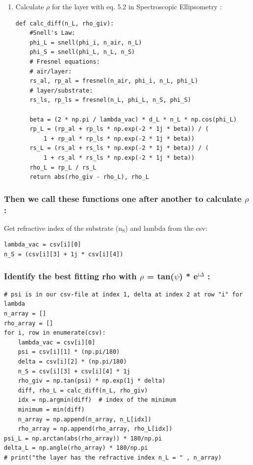 \documentclass[11pt]{article}
\begin{document}
\begin{enumerate}
\item Calculate \(\rho\) for the layer with eq. 5.2 in Spectroscopic Ellipsometry :
\label{sec:org50aedcb}
\begin{verbatim}
def calc_diff(n_L, rho_giv):
    #Snell's Law:
    phi_L = snell(phi_i, n_air, n_L)
    phi_S = snell(phi_L, n_L, n_S)
    # Fresnel equations:
    # air/layer:
    rs_al, rp_al = fresnel(n_air, phi_i, n_L, phi_L)
    # layer/substrate:
    rs_ls, rp_ls = fresnel(n_L, phi_L, n_S, phi_S)

    beta = (2 * np.pi / lambda_vac) * d_L * n_L * np.cos(phi_L)
    rp_L = (rp_al + rp_ls * np.exp(-2 * 1j * beta)) / (
        1 + rp_al * rp_ls * np.exp(-2 * 1j * beta))
    rs_L = (rs_al + rs_ls * np.exp(-2 * 1j * beta)) / (
        1 + rs_al * rs_ls * np.exp(-2 * 1j * beta))
    rho_L = rp_L / rs_L
    return abs(rho_giv - rho_L), rho_L
\end{verbatim}
\end{enumerate}


\subsubsection{Then we call these functions one after another to calculate \(\rho\):}
\label{sec:orgf340923}
Get refractive index of the substrate (n\(_{\text{S}}\)) and lambda from the csv:
\begin{verbatim}
lambda_vac = csv[i][0]
n_S = (csv[i][3] + 1j * csv[i][4])
\end{verbatim}


\subsubsection{Identify the best fitting rho with \(\rho\) = tan(\(\psi\)) * e\(^{\text{i}\Delta}\) :}
\label{sec:orgc6ab954}

\begin{verbatim}
# psi is in our csv-file at index 1, delta at index 2 at row "i" for lambda
n_array = [] 
rho_array = []
for i, row in enumerate(csv):
    lambda_vac = csv[i][0]
    psi = csv[i][1] * (np.pi/180)
    delta = csv[i][2] * (np.pi/180)
    n_S = csv[i][3] + csv[i][4] * 1j
    rho_giv = np.tan(psi) * np.exp(1j * delta)
    diff, rho_L = calc_diff(n_L, rho_giv)
    idx = np.argmin(diff)  # index of the minimum
    minimum = min(diff)
    n_array = np.append(n_array, n_L[idx])
    rho_array = np.append(rho_array, rho_L[idx])
psi_L = np.arctan(abs(rho_array)) * 180/np.pi
delta_L = np.angle(rho_array) * 180/np.pi
# print("the layer has the refractive index n_L = " , n_array)
\end{verbatim}
\end{document}
